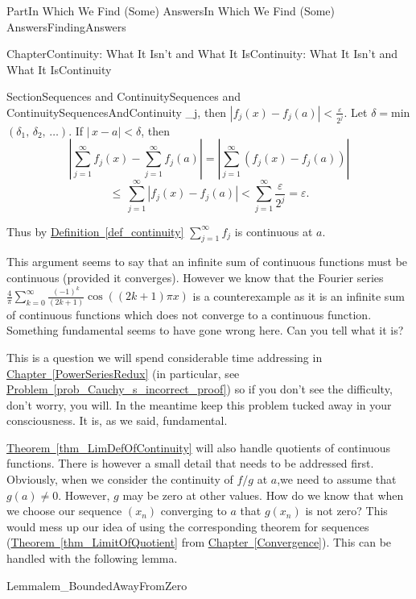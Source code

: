 \documentclass[oneside,10pt,]{book}
\newcommand{\xreffont}{\relax}
\numberwithin{equation}{part}
\newcommand{\eps}{\varepsilon}
\newcommand{\lt}{<}
\begin{document}
\begin{partptx}{Part}{In Which We Find (Some) Answers}{}{In Which We Find (Some) Answers}{}{}{FindingAnswers}
\begin{chapterptx}{Chapter}{Continuity: What It Isn't and What It Is}{}{Continuity: What It Isn't and What It Is}{}{}{Continuity}
\begin{sectionptx}{Section}{Sequences and Continuity}{}{Sequences and Continuity}{}{}{SequencesAndContinuity}
\delta_j\), then \(|f_j(x)-f_j(a)|\lt \frac{\eps}{2^j}\). Let \(\delta=\)min\(\left(\delta_1,\,\delta_2,\,\ldots\right)\). If \(|\,x-a|\lt \delta\), then%
\begin{equation*}
\left|\sum_{j=1}^\infty f_j(x)-\sum_{j=1}^\infty f_j(a)\right|=\left|\sum_{j=1}^\infty\left(f_j(x)-f_j(a)\right)\right|
\end{equation*}
%
\begin{equation*}
\leq\,\sum_{j=1}^\infty|f_j(x)-f_j(a)|\lt \sum_{j=1}^\infty\frac{ \eps}{2^j}=\eps\text{.}
\end{equation*}
%
\par
Thus by \hyperref[def_continuity]{Definition~{\xreffont\ref{def_continuity}}} \(\sum_{j=1}^\infty f_j\) is continuous at \(a\).%
\par
This argument seems to say that an infinite sum of continuous functions must be continuous (provided it converges).  However we know that the Fourier series \(\frac{4}{\pi}\sum_{k=0}^\infty\frac{\left(-1\right)^k}{\left(2k+1\right)}\cos\left(\left(2k+1\right)\pi x\right)\) is a counterexample as it is an infinite sum of continuous functions which does not converge to a continuous function. Something fundamental seems to have gone wrong here.  Can you tell what it is?%
\par
This is a question we will spend considerable time addressing in \hyperref[PowerSeriesRedux]{Chapter~{\xreffont\ref{PowerSeriesRedux}}} (in particular, see \hyperref[prob_Cauchy_s_incorrect_proof]{Problem~{\xreffont\ref{prob_Cauchy_s_incorrect_proof}}}) so if you don't see the difficulty, don't worry, you will.  In the meantime keep this problem tucked away in your consciousness. It is, as we said, fundamental.%
\par
\hyperref[thm_LimDefOfContinuity]{Theorem~{\xreffont\ref{thm_LimDefOfContinuity}}} will also handle quotients of continuous functions.  There is however a small detail that needs to be addressed first.  Obviously, when we consider the continuity of \(f/g\) at \(a\),\(\)we need to assume that \(g(a)\neq 0\).  However, \(g\) may be zero at other values.  How do we know that when we choose our sequence \(\left(x_n\right)\) converging to \(a\) that \(g(x_n)\) is not zero?  This would mess up our idea of using the corresponding theorem for sequences (\hyperref[thm_LimitOfQuotient]{Theorem~{\xreffont\ref{thm_LimitOfQuotient}}} from \hyperref[Convergence]{Chapter~{\xreffont\ref{Convergence}}}).  This can be handled with the following lemma.%
\begin{lemma}{Lemma}{}{}{lem_BoundedAwayFromZero}%

\end{lemma}
\end{sectionptx}
\end{chapterptx}
\end{partptx}
\end{document}
